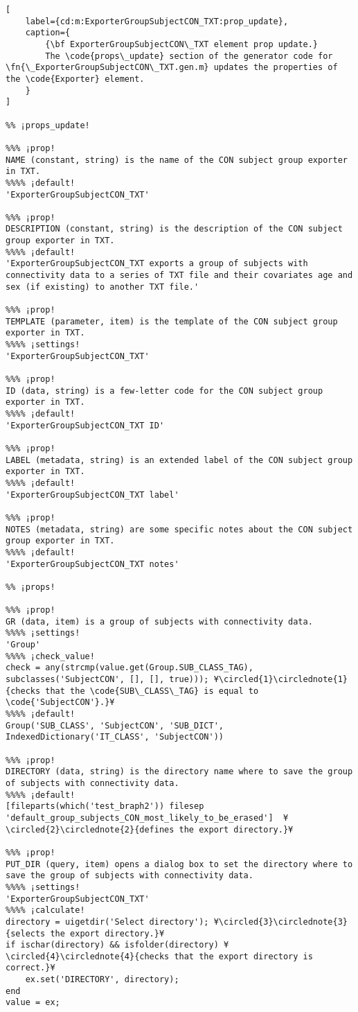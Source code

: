 \documentclass{tufte-handout}
\begin{document}
\begin{lstlisting}[
	label={cd:m:ExporterGroupSubjectCON_TXT:prop_update},
	caption={
		{\bf ExporterGroupSubjectCON\_TXT element prop update.}
		The \code{props\_update} section of the generator code for \fn{\_ExporterGroupSubjectCON\_TXT.gen.m} updates the properties of the \code{Exporter} element.
	}
]

%% ¡props_update!

%%% ¡prop!
NAME (constant, string) is the name of the CON subject group exporter in TXT.
%%%% ¡default!
'ExporterGroupSubjectCON_TXT'

%%% ¡prop!
DESCRIPTION (constant, string) is the description of the CON subject group exporter in TXT.
%%%% ¡default!
'ExporterGroupSubjectCON_TXT exports a group of subjects with connectivity data to a series of TXT file and their covariates age and sex (if existing) to another TXT file.'

%%% ¡prop!
TEMPLATE (parameter, item) is the template of the CON subject group exporter in TXT.
%%%% ¡settings!
'ExporterGroupSubjectCON_TXT'

%%% ¡prop!
ID (data, string) is a few-letter code for the CON subject group exporter in TXT.
%%%% ¡default!
'ExporterGroupSubjectCON_TXT ID'

%%% ¡prop!
LABEL (metadata, string) is an extended label of the CON subject group exporter in TXT.
%%%% ¡default!
'ExporterGroupSubjectCON_TXT label'

%%% ¡prop!
NOTES (metadata, string) are some specific notes about the CON subject group exporter in TXT.
%%%% ¡default!
'ExporterGroupSubjectCON_TXT notes'

%% ¡props!

%%% ¡prop!
GR (data, item) is a group of subjects with connectivity data. 
%%%% ¡settings!
'Group'
%%%% ¡check_value!
check = any(strcmp(value.get(Group.SUB_CLASS_TAG), subclasses('SubjectCON', [], [], true))); ¥\circled{1}\circlednote{1}{checks that the \code{SUB\_CLASS\_TAG} is equal to \code{'SubjectCON'}.}¥
%%%% ¡default!
Group('SUB_CLASS', 'SubjectCON', 'SUB_DICT', IndexedDictionary('IT_CLASS', 'SubjectCON'))

%%% ¡prop!
DIRECTORY (data, string) is the directory name where to save the group of subjects with connectivity data.
%%%% ¡default!
[fileparts(which('test_braph2')) filesep 'default_group_subjects_CON_most_likely_to_be_erased']  ¥\circled{2}\circlednote{2}{defines the export directory.}¥

%%% ¡prop!
PUT_DIR (query, item) opens a dialog box to set the directory where to save the group of subjects with connectivity data.
%%%% ¡settings!
'ExporterGroupSubjectCON_TXT'
%%%% ¡calculate!
directory = uigetdir('Select directory'); ¥\circled{3}\circlednote{3}{selects the export directory.}¥
if ischar(directory) && isfolder(directory) ¥\circled{4}\circlednote{4}{checks that the export directory is correct.}¥
	ex.set('DIRECTORY', directory);
end
value = ex;


\end{lstlisting}
\end{document}
